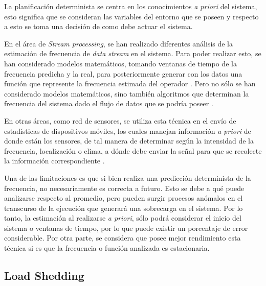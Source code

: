 La planificación determinista se centra en los conocimientos \textit{a priori} del sistema, esto significa que se consideran las variables del entorno que se poseen y respecto a esto se toma una decisión de como debe actuar el sistema. 

En el área de \textit{Stream processing}, se han realizado diferentes análisis de la estimación de frecuencia de \textit{data stream} en el sistema. Para poder realizar esto, se han considerado modelos matemáticos, tomando ventanas de tiempo de la frecuencia predicha y la real, para posteriormente generar con los datos una función que represente la frecuencia estimada del operador \citep{Ganguly09}. Pero no sólo se han considerado modelos matemáticos, sino también algoritmos que determinan la frecuencia del sistema dado el flujo de datos que se podría poseer \citep{BhuvanagiriGKS06}.

En otras áreas, como red de sensores, se utiliza esta técnica en el envío de estadísticas de dispositivos móviles, los cuales manejan información \textit{a priori} de donde están los sensores, de tal manera de determinar según la intensidad de la frecuencia, localización o clima, a dónde debe enviar la señal para que se recolecte la información correspondiente \citep{DongTS07}.

Una de las limitaciones es que si bien realiza una predicción determinista de la frecuencia, no necesariamente es correcta a futuro. Esto se debe a qué puede analizarse respecto al promedio, pero pueden surgir procesos anómalos en el transcurso de la ejecución que generará una sobrecarga en el sistema. Por lo tanto, la estimación al realizarse \textit{a priori}, sólo podrá considerar el inicio del sistema o ventanas de tiempo, por lo que puede existir un porcentaje de error considerable. Por otra parte, se considera que posee mejor rendimiento esta técnica si es que la frecuencia o función analizada es estacionaria.

\subsection{Load Shedding}
\label{sec:loadSheddingBC}

